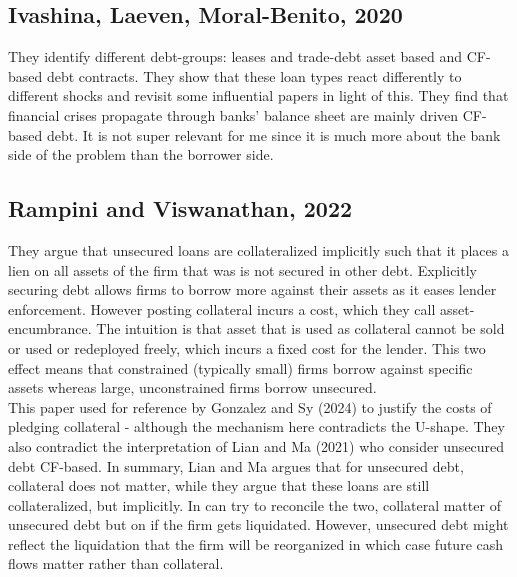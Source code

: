 \documentclass[12pt]{article}
\begin{document}
\subsection*{Ivashina, Laeven, Moral-Benito, 2020  \checkmark}
They identify different debt-groups: leases and trade-debt asset based and CF-based debt contracts. They show that these loan types react differently to different shocks and revisit some influential papers in light of this. They find that financial crises propagate through banks' balance sheet are mainly driven CF-based debt. It is not super relevant for me since it is much more about the bank side of the problem than the borrower side. 

\subsection*{Rampini and Viswanathan, 2022 \checkmark}
They argue that unsecured loans are collateralized implicitly such that it places a lien on all assets of the firm that was is not secured in other debt. Explicitly securing debt allows firms to borrow more against their assets as it eases lender enforcement. However posting collateral incurs a cost, which they call asset-encumbrance. The intuition is that asset that is used as collateral cannot be sold or used or redeployed freely, which incurs a fixed cost for the lender. This two effect means that constrained (typically small) firms borrow against specific assets whereas large, unconstrained firms borrow unsecured. \vspace*{3mm} \\ 
This paper used for reference by Gonzalez and Sy (2024) to justify the costs of pledging collateral - although the mechanism here contradicts the U-shape. They also contradict the interpretation of Lian and Ma (2021) who consider unsecured debt CF-based. In summary, Lian and Ma argues that for unsecured debt, collateral does not matter, while they argue that these loans are still collateralized, but implicitly. In can try to reconcile the two, collateral matter of unsecured debt but on if the firm gets liquidated. However, unsecured debt might reflect the liquidation that the firm will be reorganized in which case future cash flows matter rather than collateral. 
\end{document}
